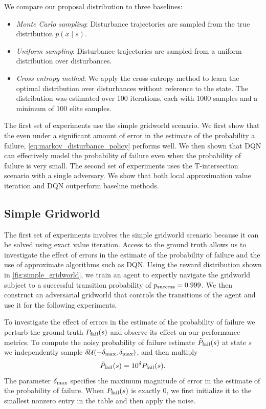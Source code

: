 We compare our proposal distribution to three baselines:
\begin{itemize}
    \item \emph{Monte Carlo sampling}: Disturbance trajectories are sampled from the true distribution $p(x \mid s)$.
    \item \emph{Uniform sampling}: Disturbance trajectories are sampled from a uniform distribution over disturbances. 
    \item \emph{Cross entropy method}: We apply the cross entropy method to learn the optimal distribution over disturbances without reference to the state. The distribution was estimated over \num{100} iterations, each with \num{1000} samples and a minimum of \num{100} elite samples.
\end{itemize}

The first set of experiments use the simple gridworld scenario. We first show that the even under a significant amount of error in the estimate of the probability a failure, \cref{eq:markov_disturbance_policy} performs well. We then shown that DQN can effectively model the probability of failure even when the probability of failure is very small. The second set of experiments uses the T-intersection scenario with a single adversary. We show that both local approximation value iteration and DQN outperform baseline methods. 

\subsection{Simple Gridworld}

The first set of experiments involves the simple gridworld scenario because it can be solved using exact value iteration. Access to the ground truth allows us to investigate the effect of errors in the estimate of the probability of failure and the use of approximate algorithms such as DQN. Using the reward distribution shown in \cref{fig:simple_gridworld}, we train an agent to expertly navigate the gridworld subject to a successful transition probability of $p_{\rm success} = 0.999$. We then construct an adversarial gridworld that controls the transitions of the agent and use it for the following experiments.

To investigate the effect of errors in the estimate of the probability of failure we perturb the ground truth $P_{\rm fail}(s)$ and observe its effect on our performance metrics. To compute the noisy probability of failure estimate $\tilde{P}_{\rm fail}(s)$ at state $s$ we independently sample $\delta \mathcal{U}(-\delta_{\rm max}, \delta_{\rm max})$, and then multiply
\begin{equation}
    \tilde{P}_{\rm fail}(s) = 10^\delta P_{\rm fail}(s) \text{.}
\end{equation}
The parameter $\delta_{\rm max}$ specifies the maximum magnitude of error in the estimate of the probability of failure. When $P_{\rm fail}(s)$ is exactly \num{0}, we first initialize it to the smallest nonzero entry in the table and then apply the noise. 

